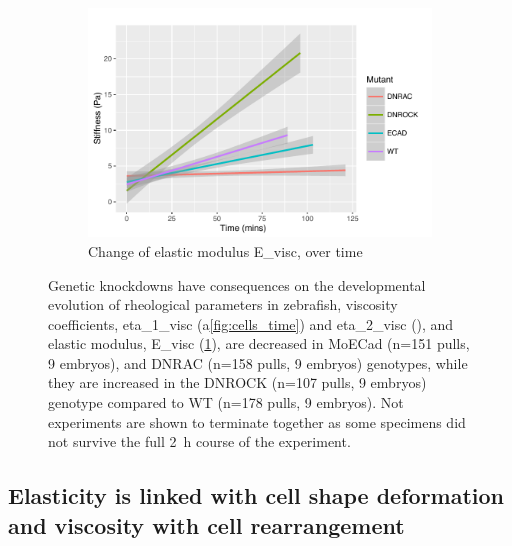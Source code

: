 \begin{figure}
  \ContinuedFloat{}
   \begin{subfigure}[t]{1\linewidth}
   \centering
   \includegraphics{Chapters/tweezers/Figs/PDF/Stiffness_-_Time}
   \caption{Change of elastic modulus \gls{E_visc}, over time}\label{fig:stiffness_time}
  \end{subfigure}\hfill
  \caption[Genetic knockdowns have consequences on the developmental evolution of rheological parameters in \gls{zebrafish}]{
Genetic knockdowns have consequences on the developmental evolution of rheological parameters in \gls{zebrafish}, viscosity coefficients, \gls{eta_1_visc} (a\ref{fig:cells_time}) and \gls{eta_2_visc} (), and elastic modulus, \gls{E_visc} (\ref{fig:stiffness_time}), are decreased in MoECad (n=151 pulls, 9 embryos), and \gls{DNRAC} (n=158 pulls, 9 embryos) genotypes, while they are increased in the \gls{DNROCK} (n=107 pulls, 9 embryos) genotype compared to \gls{WT} (n=178 pulls, 9 embryos).
Not experiments are shown to terminate together as some specimens did not survive the full \SI{2}{\hour} course of the experiment.
  }\label{fig:visco_time}
\end{figure}

\subsection{Elasticity is linked with cell shape deformation and viscosity with cell rearrangement}

